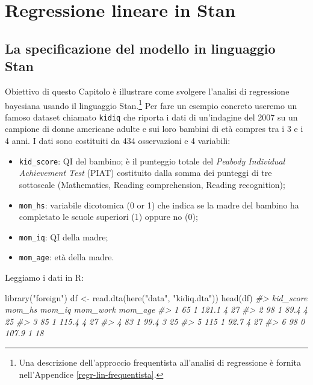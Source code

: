 \documentclass[
  10pt,
  italian,
  a4paper,
  extrafontsizes,onecolumn,openright
  ]{memoir}
\newenvironment{Shaded}{\begin{snugshade}}{\end{snugshade}}
\newcommand{\CommentTok}[1]{\textcolor[rgb]{0.56,0.35,0.01}{\textit{#1}}}
\newcommand{\FunctionTok}[1]{\textcolor[rgb]{0.00,0.00,0.00}{#1}}
\newcommand{\NormalTok}[1]{#1}
\newcommand{\OtherTok}[1]{\textcolor[rgb]{0.56,0.35,0.01}{#1}}
\newcommand{\StringTok}[1]{\textcolor[rgb]{0.31,0.60,0.02}{#1}}
\providecommand{\tightlist}{%
  \setlength{\itemsep}{0pt}\setlength{\parskip}{0pt}}
\newcommand{\R}{\textsf{R}} %
\begin{document}
\hypertarget{reg-lin-stan}{%
\chapter{Regressione lineare in Stan}\label{reg-lin-stan}}

\hypertarget{la-specificazione-del-modello-in-linguaggio-stan}{%
\section{La specificazione del modello in linguaggio Stan}\label{la-specificazione-del-modello-in-linguaggio-stan}}

Obiettivo di questo Capitolo è illustrare come svolgere l'analisi di regressione bayesiana usando il linguaggio Stan.\footnote{Una descrizione dell'approccio frequentista all'analisi di regressione è fornita nell'Appendice \ref{regr-lin-frequentista}.} Per fare un esempio concreto useremo un famoso dataset chiamato \texttt{kidiq} \autocite{gelman2020regression} che riporta i dati di un'indagine del 2007 su un campione di donne americane adulte e sui loro bambini di età compres tra i 3 e i 4 anni. I dati sono costituiti da 434 osservazioni e 4 variabili:

\begin{itemize}
\tightlist
\item
  \texttt{kid\_score}: QI del bambino; è il punteggio totale del \emph{Peabody Individual Achievement Test} (PIAT) costituito dalla somma dei punteggi di tre sottoscale (Mathematics, Reading comprehension, Reading recognition);
\item
  \texttt{mom\_hs}: variabile dicotomica (0 or 1) che indica se la madre del bambino ha completato le scuole superiori (1) oppure no (0);
\item
  \texttt{mom\_iq}: QI della madre;
\item
  \texttt{mom\_age}: età della madre.
\end{itemize}

Leggiamo i dati in \R:

\begin{Shaded}
\begin{Highlighting}[]
\FunctionTok{library}\NormalTok{(}\StringTok{"foreign"}\NormalTok{)}
\NormalTok{df }\OtherTok{\textless{}{-}} \FunctionTok{read.dta}\NormalTok{(}\FunctionTok{here}\NormalTok{(}\StringTok{"data"}\NormalTok{, }\StringTok{"kidiq.dta"}\NormalTok{))}
\FunctionTok{head}\NormalTok{(df)}
\CommentTok{\#\textgreater{}   kid\_score mom\_hs mom\_iq mom\_work mom\_age}
\CommentTok{\#\textgreater{} 1        65      1  121.1        4      27}
\CommentTok{\#\textgreater{} 2        98      1   89.4        4      25}
\CommentTok{\#\textgreater{} 3        85      1  115.4        4      27}
\CommentTok{\#\textgreater{} 4        83      1   99.4        3      25}
\CommentTok{\#\textgreater{} 5       115      1   92.7        4      27}
\CommentTok{\#\textgreater{} 6        98      0  107.9        1      18}
\end{Highlighting}
\end{Shaded}
\end{document}
